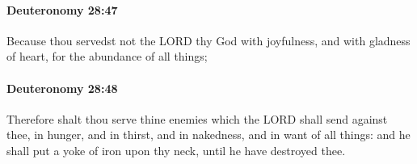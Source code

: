 		\paragraph{Deuteronomy 28:47} %
			\label{DEUTERONOMY-28-47}

			Because thou servedst not the LORD thy God with joyfulness, and with gladness of heart, for the abundance of all things;


		\paragraph{Deuteronomy 28:48} %
			\label{DEUTERONOMY-28-48}

			Therefore shalt thou serve thine enemies which the LORD shall send against thee, in hunger, and in thirst, and in nakedness, and in want of all things: and he shall put a yoke of iron upon thy neck, until he have destroyed thee.

